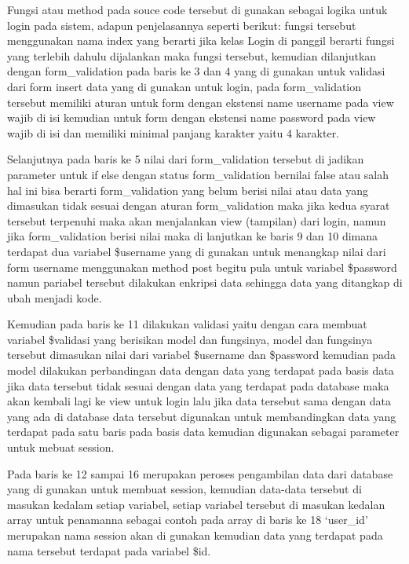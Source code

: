 Fungsi atau method pada souce code tersebut di gunakan sebagai logika untuk login pada sistem, adapun penjelasannya seperti berikut: fungsi tersebut menggunakan nama index yang berarti jika kelas Login di panggil berarti fungsi yang terlebih dahulu dijalankan maka fungsi tersebut, kemudian dilanjutkan dengan form\_validation pada baris ke 3 dan 4 yang di gunakan untuk validasi dari form insert data yang di gunakan untuk login, pada form\_validation tersebut memiliki aturan untuk form dengan ekstensi name username pada view wajib di isi kemudian untuk form dengan ekstensi name password pada view wajib di isi dan memiliki minimal panjang karakter yaitu 4 karakter.\par
	Selanjutnya pada baris ke 5 nilai dari form\_validation tersebut di jadikan parameter untuk if else dengan status form\_validation bernilai false atau salah hal ini bisa berarti form\_validation yang belum berisi nilai atau data yang dimasukan tidak sesuai dengan aturan form\_validation maka jika kedua syarat tersebut terpenuhi maka akan menjalankan view (tampilan) dari login, namun jika form\_validation berisi nilai maka di lanjutkan ke baris 9 dan 10 dimana terdapat dua variabel \$username yang di gunakan untuk menangkap nilai dari form username menggunakan method post begitu pula untuk variabel \$password namun pariabel tersebut dilakukan enkripsi data sehingga data yang ditangkap di ubah menjadi kode.\par
	Kemudian pada baris ke 11 dilakukan validasi yaitu dengan cara membuat variabel \$validasi yang berisikan model dan fungsinya, model dan fungsinya tersebut dimasukan nilai dari variabel \$username dan \$password kemudian pada model dilakukan perbandingan data dengan data yang terdapat pada basis data jika data tersebut tidak sesuai dengan data yang terdapat pada database maka akan kembali lagi ke view untuk login lalu jika data tersebut sama dengan data yang ada di database data tersebut digunakan untuk membandingkan data yang terdapat pada satu baris pada basis data kemudian digunakan sebagai parameter untuk mebuat session.\par
	Pada baris ke 12 sampai 16 merupakan peroses pengambilan data dari database yang di gunakan untuk membuat session, kemudian data-data tersebut di masukan kedalam setiap variabel, setiap variabel tersebut di masukan kedalan array untuk penamanna sebagai contoh pada array di baris ke 18 ‘user\_id’ merupakan nama session akan di gunakan kemudian data yang terdapat pada nama tersebut terdapat pada variabel \$id.\par
